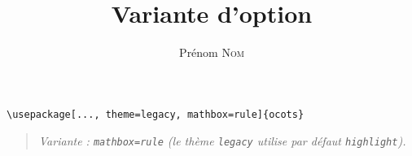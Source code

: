 \documentclass[11pt]{ocots-book}
\title{Variante d'option}
\author{Prénom \textsc{Nom}}
\newcommand{\ocotsvariantnote}[1]{\begin{quote}\itshape Variante : #1\end{quote}}
\begin{document}
\maketitle

\begin{lstlisting}
\usepackage[..., theme=legacy, mathbox=rule]{ocots}
\end{lstlisting}
\ocotsvariantnote{\texttt{mathbox=rule} (le th\`eme \texttt{legacy} utilise par d\'efaut \texttt{highlight}).}

\end{document}
